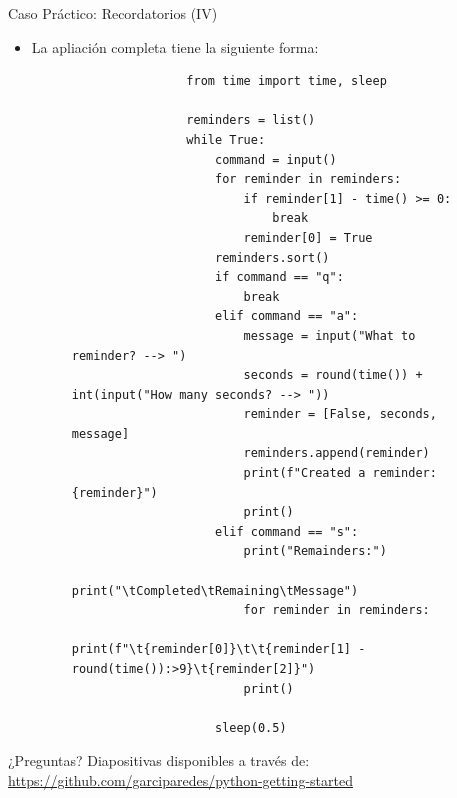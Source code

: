 \documentclass{beamer}
\begin{document}
    \begin{frame}[fragile]{Caso Práctico: Recordatorios (IV)}
      \begin{itemize}
        \item La apliación completa tiene la siguiente forma:
        \begin{figure}
            \begin{minipage}[c]{\textwidth}
                \begin{verbatim}
                from time import time, sleep

                reminders = list()
                while True:
                    command = input()
                    for reminder in reminders:
                        if reminder[1] - time() >= 0:
                            break
                        reminder[0] = True
                    reminders.sort()
                    if command == "q":
                        break
                    elif command == "a":
                        message = input("What to reminder? --> ")
                        seconds = round(time()) + int(input("How many seconds? --> "))
                        reminder = [False, seconds, message]
                        reminders.append(reminder)
                        print(f"Created a reminder: {reminder}")
                        print()
                    elif command == "s":
                        print("Remainders:")
                        print("\tCompleted\tRemaining\tMessage")
                        for reminder in reminders:
                            print(f"\t{reminder[0]}\t\t{reminder[1] - round(time()):>9}\t{reminder[2]}")
                        print()

                    sleep(0.5)
                \end{verbatim}
            \end{minipage}
        \end{figure}
      \end{itemize}
    \end{frame}

    \begin{frame}
        \begin{center}
            {\Huge ¿Preguntas?}
            \vfill
            Diapositivas disponibles a través de:
            \\
            {\small\url{https://github.com/garciparedes/python-getting-started}}
        \end{center}
    \end{frame}
\end{document}
